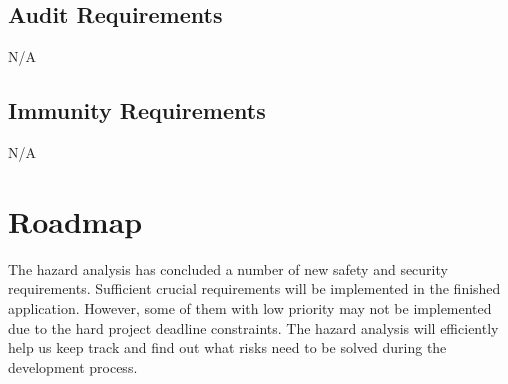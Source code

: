 \documentclass{article}
\begin{document}
\subsection{Audit Requirements}
N/A
\subsection{Immunity Requirements}
N/A
\section{Roadmap}
The hazard analysis has concluded a number of new safety and security requirements. Sufficient crucial requirements will be implemented in the finished application. However, some of them with low priority may not be implemented due to the hard project deadline constraints. The hazard analysis will efficiently help us keep track and find out what risks need to be solved during the development process.
\end{document}

